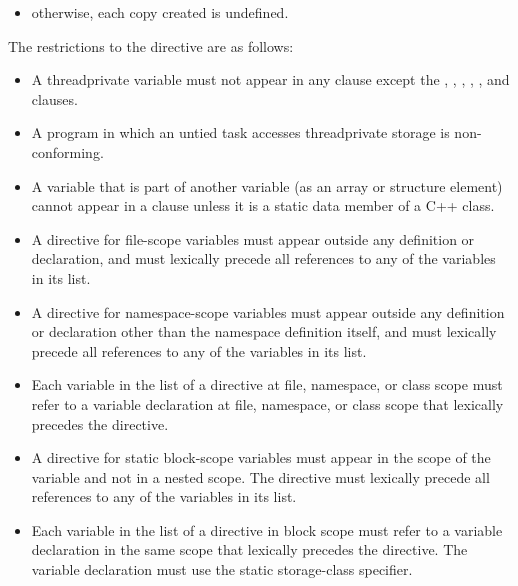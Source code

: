 {{{{\begin{itemize}
\begin{samepage}
\begin{itemize}
\item otherwise, each copy created is undefined.
\end{itemize} %
\end{samepage}

\end{itemize} %
\fortranspecificend

\restrictions
The restrictions to the  directive are as follows:

\begin{itemize} %
\item A threadprivate variable must not appear in any clause except the , 
, , , , and  clauses.

\item A program in which an untied task accesses threadprivate storage is non-conforming.

\ccppspecificstart
\item A variable that is part of another variable (as an array or structure element) cannot 
appear in a  clause unless it is a static data member of a C++ 
class.

\item A  directive for file-scope variables must appear outside any 
definition or declaration, and must lexically precede all references to any of the 
variables in its list.

\item A  directive for namespace-scope variables must appear outside 
any definition or declaration other than the namespace definition itself, and must 
lexically precede all references to any of the variables in its list.

\item Each variable in the list of a  directive at file, namespace, or class 
scope must refer to a variable declaration at file, namespace, or class scope that 
lexically precedes the directive.

\item A  directive for static block-scope variables must appear in the 
scope of the variable and not in a nested scope. The directive must lexically precede 
all references to any of the variables in its list.

\item Each variable in the list of a  directive in block scope must refer to 
a variable declaration in the same scope that lexically precedes the directive. The 
variable declaration must use the static storage-class specifier.


\end{itemize}}}}}
